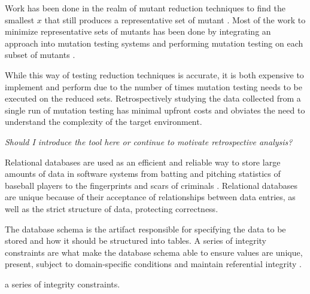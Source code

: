 Work has been done in the realm of mutant reduction techniques to find the smallest $x$ that still produces
a representative set of mutant \cite{jia2011analysis, mathur1994empirical}. Most of the work
to minimize representative sets of mutants has been done by integrating an approach into
mutation testing systems and performing mutation testing on each subset of mutants \cite{demillo1978hints, king1991fortran}.

While this way of testing reduction techniques is accurate, it is both
expensive to implement and perform due to the number of times mutation testing
needs to be executed on the reduced sets. Retrospectively studying the data
collected from a single run of mutation testing has minimal upfront costs and obviates the need
to understand the complexity of the target environment.

\textit{Should I introduce the tool here or continue to motivate retrospective analysis?}

Relational databases are used as an efficient and reliable way to store large amounts of data in software
systems from batting and pitching statistics of baseball players \cite{} to the fingerprints and scars
of criminals \cite{}. Relational databases are unique because of their acceptance of relationships between
data entries, as well as the strict structure of data, protecting correctness.

The database schema is the artifact responsible for specifying the data to be stored and
how it should be structured into tables. A series of integrity constraints
are what make the database schema able to ensure values are unique, present,
subject to domain-specific conditions and maintain referential integrity \cite{mcminnvirtual}.

a series of integrity constraints.

